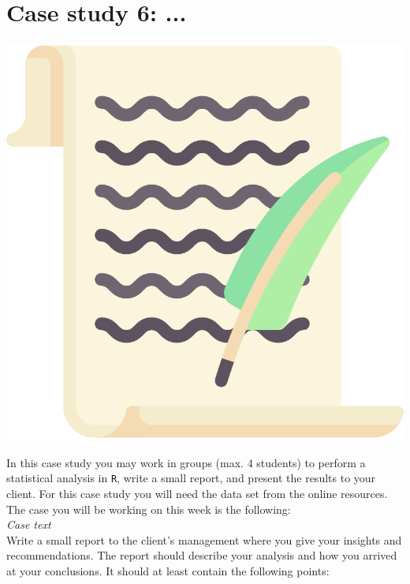 
\begin{minipage}{0.8\textwidth}
\section{Case study 6: ...}
\end{minipage}%
\hfill%
\begin{minipage}{0.1\textwidth}
\includegraphics[width=\linewidth]{Files/Images/lettericon.pdf}
\end{minipage}
\vspace*{.1cm}

In this case study you may work in groups (max. 4 students) to perform a statistical analysis in \texttt{R}, write a small report, and present the results to your client. For this case study you will need the data set  from the online resources. The case you will be working on this week is the following: \\

\textit{Case text} \\

Write a small report to the client's management where you give your insights and recommendations. The report should describe your analysis and how you arrived at your conclusions. It should at least contain the following points: \\


